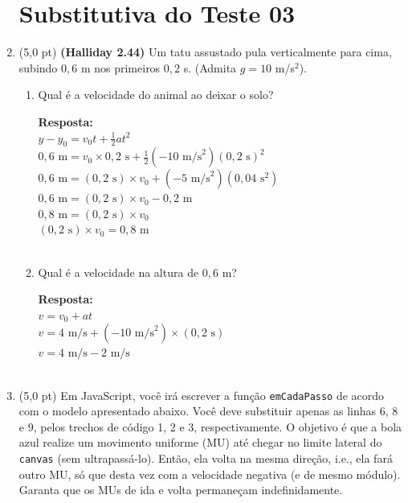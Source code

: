 \documentclass[12pt,a4paper,oneside]{article}
\begin{document}
\begin{enumerate}
	
	\section*{Substitutiva do Teste 03}

\item (5,0 pt) {\bf (Halliday 2.44)} Um tatu assustado pula verticalmente para cima, subindo $0,6$ m nos primeiros $0,2$ s. (Admita $g= 10$ m/s$^2$).
\begin{enumerate}
	\item Qual é a velocidade do animal ao deixar o solo?
	
	\vspace*{0.3cm}
	
	{\color{blue} {\bf Resposta:} \\
		$y - y_0 = v_0t + \frac{1}{2}at^2$ \\
		$0,6 \mbox{ m} = v_0\times 0,2 \mbox{ s} + \frac{1}{2}(-10 \mbox{ m/s}^2)(0,2 \mbox{ s})^2$ \\
		$0,6 \mbox{ m} = (0,2\mbox{ s})\times v_0  + (-5 \mbox{ m/s}^2)(0,04 \mbox{ s}^2)$ \\
		$0,6 \mbox{ m} = (0,2\mbox{ s})\times v_0  -0,2 \mbox{ m}$ \\
		$0,8 \mbox{ m} = (0,2\mbox{ s})\times v_0$\\
		$(0,2\mbox{ s})\times v_0 = 0,8 \mbox{ m}$\\
		\\
	}
	\item Qual é a velocidade na altura de $0,6$ m?
	
	\vspace*{0.3cm}
	
	{\color{blue} {\bf Resposta:} \\
		$v = v_0 + a t$\\
		$v = 4 \mbox{ m/s} + (-10 \mbox{ m/s}^2)\times (0,2 \mbox{ s})$\\
		$v = 4 \mbox{ m/s} -2 \mbox{ m/s}$\\
		\\
	}
\end{enumerate}	 
	
	\newpage
	
	\item (5,0 pt) Em JavaScript, você irá escrever a função {\tt emCadaPasso} de acordo com o modelo apresentado abaixo. Você deve substituir apenas as linhas 6, 8 e 9, pelos trechos de código 1, 2 e 3, respectivamente. O objetivo é que a bola azul realize um movimento uniforme (MU) até chegar no limite lateral do {\tt canvas} (sem ultrapassá-lo). Então, ela volta na mesma direção, i.e., ela fará outro MU, só que desta vez com a velocidade negativa (e de mesmo módulo). Garanta que os MUs de ida e volta permaneçam indefinidamente.
	

\end{enumerate}
\end{document}
